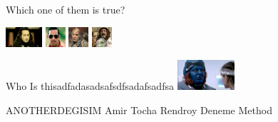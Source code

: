 \documentclass{exam}
\begin{document}
\begin{questions}
\question Which one of them is true?\newline
\begin{oneparchoices}
\choice \includegraphics[height=2em]{komutanlogar.jpeg}
\choice \includegraphics[height=2em]{arifisik.jpg}
\choice \includegraphics[height=2em]{216.jpg}
\choice \includegraphics[height=2em]{faruk.jpg}
\end{oneparchoices}
\question Who Is thisadfadasadsafsdfsadafsadfsa\newline
\includegraphics[height=3em]{rendroy2.jpg} \newline
\begin{oneparchoices}
\choice ANOTHERDEGISIM
\choice Amir Tocha
\choice Rendroy
\choice Deneme Method
\end{oneparchoices}
\end{questions}
\end{document}
